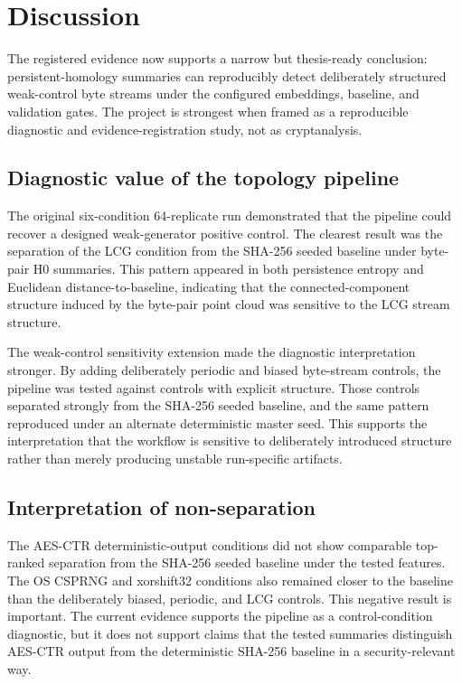 
\section{Discussion}
\label{sec:discussion}

The registered evidence now supports a narrow but thesis-ready conclusion: persistent-homology summaries can reproducibly detect deliberately structured weak-control byte streams under the configured embeddings, baseline, and validation gates. The project is strongest when framed as a reproducible diagnostic and evidence-registration study, not as cryptanalysis.

\subsection{Diagnostic value of the topology pipeline}
\label{subsec:diagnostic-value}

The original six-condition 64-replicate run demonstrated that the pipeline could recover a designed weak-generator positive control. The clearest result was the separation of the LCG condition from the SHA-256 seeded baseline under byte-pair H0 summaries. This pattern appeared in both persistence entropy and Euclidean distance-to-baseline, indicating that the connected-component structure induced by the byte-pair point cloud was sensitive to the LCG stream structure.

The weak-control sensitivity extension made the diagnostic interpretation stronger. By adding deliberately periodic and biased byte-stream controls, the pipeline was tested against controls with explicit structure. Those controls separated strongly from the SHA-256 seeded baseline, and the same pattern reproduced under an alternate deterministic master seed. This supports the interpretation that the workflow is sensitive to deliberately introduced structure rather than merely producing unstable run-specific artifacts.

\subsection{Interpretation of non-separation}
\label{subsec:non-separation}

The AES-CTR deterministic-output conditions did not show comparable top-ranked separation from the SHA-256 seeded baseline under the tested features. The OS CSPRNG and xorshift32 conditions also remained closer to the baseline than the deliberately biased, periodic, and LCG controls. This negative result is important. The current evidence supports the pipeline as a control-condition diagnostic, but it does not support claims that the tested summaries distinguish AES-CTR output from the deterministic SHA-256 baseline in a security-relevant way.

